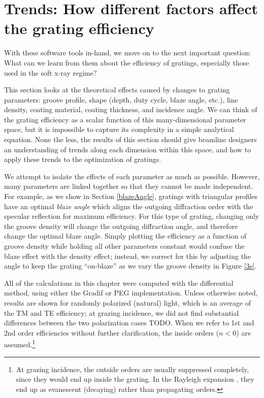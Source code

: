 \chapter{Trends: How different factors affect the grating efficiency}
With these software tools in-hand, we move on to the next important question: What can we learn from them about the efficiency of gratings, especially those used in the soft x-ray regime?

This section looks at the theoretical effects caused by changes to grating parameters: groove profile, shape (depth, duty cycle, blaze angle, etc.), line density, coating material, coating thickness, and incidence angle.  We can think of the grating efficiency as a scalar function of this many-dimensional parameter space, but it is impossible to capture its complexity in a simple analytical equation.  None the less, the results of this section should give beamline designers an understanding of trends along each dimension within this space, and how to apply these trends to the optimization of gratings.

We attempt to isolate the effects of each parameter as much as possible.  However, many parameters are linked together so that they cannot be made independent.  For example, as we show in Section \ref{blazeAngle}, gratings with triangular profiles have an optimal \emph{blaze angle} which aligns the outgoing diffraction order with the specular reflection for maximum efficiency.  For this type of grating, changing only the groove density will change the outgoing diffraction angle, and therefore change the optimal blaze angle.  Simply plotting the efficiency as a function of groove density while holding all other parameters constant would confuse the blaze effect with the density effect; instead, we correct for this by adjusting the angle to keep the grating ``on-blaze'' as we vary the groove density in Figure \ref{3e}.

All of the calculations in this chapter were computed with the differential method, using either the Gradif or PEG implementation.  Unless otherwise noted, results are shown for randomly polarized (natural) light, which is an average of the TM and TE efficiency; at grazing incidence, we did not find substantial differences between the two polarization cases TODO.  When we refer to 1st and 2nd order efficiencies without further clarification, the inside orders ($n<0$) are assumed.\footnote{At grazing incidence, the outside orders are usually suppressed completely, since they would end up inside the grating. In the Rayleigh expansion , they end up as evanescent (decaying) rather than propagating orders.}
